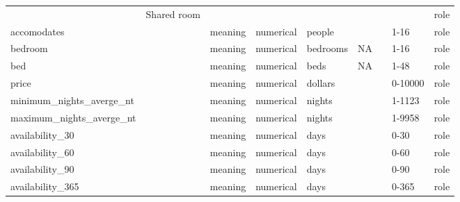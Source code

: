 \begin{center}
\begin{longtable}{@{}llllllll@{}}
                            & Shared room                 &                                   &             &                &                             &                     &         & role \\
accomodates                 &                             & meaning                           & numerical   & people         &                             &                     & 1-16    & role \\
bedroom                     &                             & meaning                           & numerical   & bedrooms       & NA                          &                     & 1-16    & role \\
bed                         &                             & meaning                           & numerical   & beds           & NA                          &                     & 1-48    & role \\
price                       &                             & meaning                           & numerical   & dollars        &                             &                     & 0-10000 & role \\
minimum\_nights\_averge\_nt &                             & meaning                           & numerical   & nights         &                             &                     & 1-1123  & role \\
maximum\_nights\_averge\_nt &                             & meaning                           & numerical   & nights         &                             &                     & 1-9958  & role \\
availability\_30            &                             & meaning                           & numerical   & days           &                             &                     & 0-30    & role \\
availability\_60            &                             & meaning                           & numerical   & days           &                             &                     & 0-60    & role \\
availability\_90            &                             & meaning                           & numerical   & days           &                             &                     & 0-90    & role \\
availability\_365           &                             & meaning                           & numerical   & days           &                             &                     & 0-365   & role \\

\end{longtable}
\end{center}
